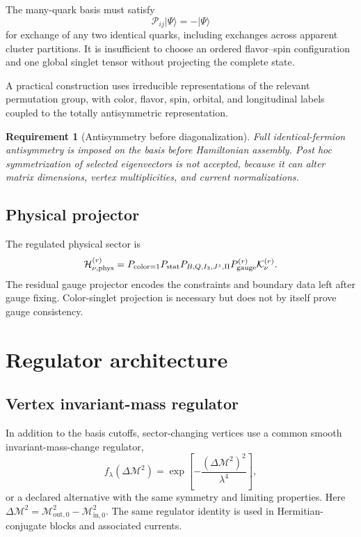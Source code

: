 \documentclass[11pt]{article}
\newtheorem{requirement}[definition]{Requirement}
\newcommand{\Hil}{\mathcal H}
\newcommand{\cM}{\mathcal M}
\newcommand{\cK}{\mathcal K}
\newcommand{\cP}{\mathcal P}
\newcommand{\phys}{\mathrm{phys}}
\newcommand{\Jz}{J^z}
\begin{document}
The many-quark basis must satisfy
\begin{equation}
 \cP_{ij}|\Psi\rangle=-|\Psi\rangle
 \label{eq:fermion-antisymmetry}
\end{equation}
for exchange of any two identical quarks, including exchanges across apparent
cluster partitions.  It is insufficient to choose an ordered flavor--spin
configuration and one global singlet tensor without projecting the complete
state.

A practical construction uses irreducible representations of the relevant
permutation group, with color, flavor, spin, orbital, and longitudinal labels
coupled to the totally antisymmetric representation.

\begin{requirement}[Antisymmetry before diagonalization]
Full identical-fermion antisymmetry is imposed on the basis before Hamiltonian
assembly.  Post hoc symmetrization of selected eigenvectors is not accepted,
because it can alter matrix dimensions, vertex multiplicities, and current
normalizations.
\label{req:antisymmetry}
\end{requirement}

\subsection{Physical projector}

The regulated physical sector is
\begin{equation}
 \Hil_{\nu,\phys}^{(r)}
 =P_{\rm color=1}
 P_{\rm stat}
 P_{B,Q,I_3,\Jz,\Pi}
 P_{\rm gauge}^{(r)}
 \cK_{\nu}^{(r)}.
 \label{eq:physical-projector}
\end{equation}
The residual gauge projector encodes the constraints and boundary data left
after gauge fixing.  Color-singlet projection is necessary but does not by
itself prove gauge consistency.

\section{Regulator architecture}
\label{sec:regulators}

\subsection{Vertex invariant-mass regulator}

In addition to the basis cutoffs, sector-changing vertices use a common smooth
invariant-mass-change regulator,
\begin{equation}
 f_{\lambda}
 \left(\Delta\cM^2\right)
 =\exp\left[-\frac{(\Delta\cM^2)^2}{\lambda^4}\right],
 \label{eq:vertex-regulator}
\end{equation}
or a declared alternative with the same symmetry and limiting properties.
Here
\(\Delta\cM^2=\cM_{\mathrm{out},0}^2-\cM_{\mathrm{in},0}^2\).  The same regulator
identity is used in Hermitian-conjugate blocks and associated currents.
\end{document}
